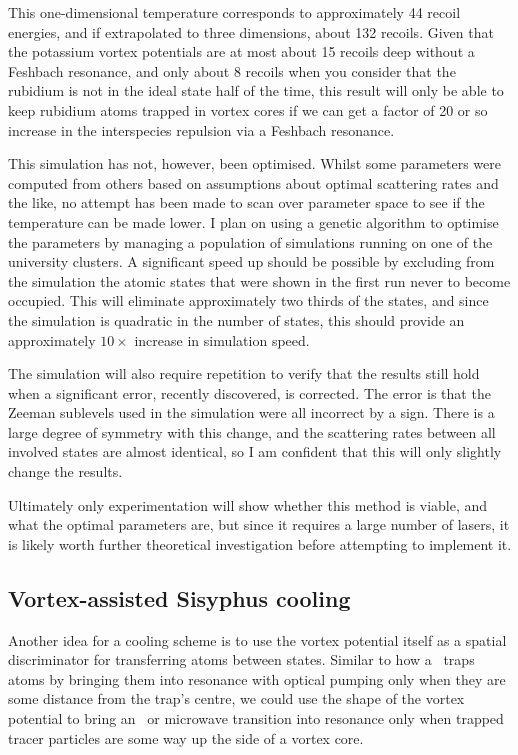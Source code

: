 This one-dimensional temperature corresponds to approximately 44 recoil energies, and if extrapolated to three dimensions, about 132 recoils. Given that the potassium vortex potentials are at most about 15 recoils deep without a Feshbach resonance, and only about 8 recoils when you consider that the rubidium is not in the ideal state half of the time, this result will only be able to keep rubidium atoms trapped in vortex cores if we can get a factor of 20 or so increase in the interspecies repulsion via a Feshbach resonance.

This simulation has not, however, been optimised. Whilst some parameters were computed from others based on assumptions about optimal scattering rates and the like, no attempt has been made to scan over parameter space to see if the temperature can be made lower. I plan on using a genetic algorithm to optimise the parameters by managing a population of simulations running on one of the university clusters. A significant speed up should be possible by excluding from the simulation the atomic states that were shown in the first run never to become occupied. This will eliminate approximately two thirds of the states, and since the simulation is quadratic in the number of states, this should provide an approximately $10\times$ increase in simulation speed.

The simulation will also require repetition to verify that the results still hold when a significant error, recently discovered, is corrected. The error is that the Zeeman sublevels used in the simulation were all incorrect by a sign. There is a large degree of symmetry with this change, and the scattering rates between all involved states are almost identical, so I am confident that this will only slightly change the results.

Ultimately only experimentation will show whether this method is viable, and what the optimal parameters are, but since it requires a large number of lasers, it is likely worth further theoretical investigation before attempting to implement it.

\subsection{Vortex-assisted Sisyphus cooling}\label{sec:vortexcooling}
Another idea for a cooling scheme is to use the vortex potential itself as a spatial discriminator for transferring atoms between states. Similar to how a \mot\ traps atoms by bringing them into resonance with optical pumping only when they are some distance from the trap's centre, we could use the shape of the vortex potential to bring an \rf\ or microwave transition into resonance only when trapped tracer particles are some way up the side of a vortex core.

